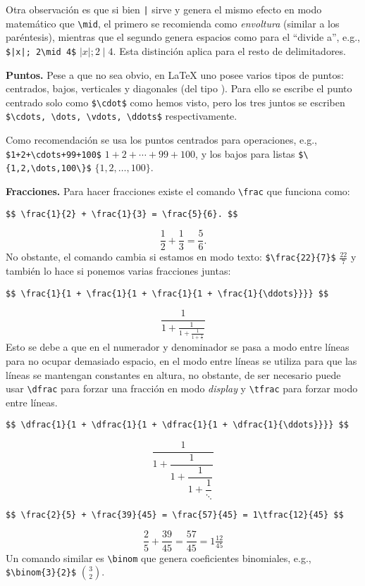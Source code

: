 Otra observación es que si bien \lstinline!|! sirve y genera el mismo efecto en modo matemático que \lstinline|\mid|, el primero se recomienda como \textit{envoltura} (similar a los paréntesis), mientras que el segundo genera espacios como para el ``divide a'', e.g., \lstinline!$|x|; 2\mid 4$! $|x|; 2\mid 4$.
Esta distinción aplica para el resto de delimitadores.

\textbf{Puntos.} Pese a que no sea obvio, en \LaTeX{} uno posee varios tipos de puntos: centrados, bajos, verticales y diagonales (del tipo \smash{$\ddots$}). Para ello se escribe el punto centrado solo como \lstinline|$\cdot$| como hemos visto, pero los tres juntos se escriben \lstinline|$\cdots, \dots, \vdots, \ddots$| \smash{$\cdots, \dots, \vdots, \ddots$} respectivamente.

Como recomendación se usa los puntos centrados para operaciones, e.g., \lstinline|$1+2+\cdots+99+100$| $1+2+\cdots+99+100$, y los bajos para listas \lstinline|$\{1,2,\dots,100\}$| $\{1,2,\dots,100\}$.

\textbf{Fracciones.} Para hacer fracciones existe el comando \lstinline|\frac| que funciona como:
\begin{lstlisting}
$$ \frac{1}{2} + \frac{1}{3} = \frac{5}{6}. $$
\end{lstlisting}
$$ \frac{1}{2} + \frac{1}{3} = \frac{5}{6}. $$
No obstante, el comando cambia si estamos en modo texto: \lstinline|$\frac{22}{7}$| $\frac{22}{7}$ y también lo hace si ponemos varias fracciones juntas:
\begin{lstlisting}[basicstyle=\scriptsize\ttfamily]
$$ \frac{1}{1 + \frac{1}{1 + \frac{1}{1 + \frac{1}{\ddots}}}} $$
\end{lstlisting}
$$ \frac{1}{1 + \frac{1}{1 + \frac{1}{1 + \frac{1}{\ddots}}}} $$
Esto se debe a que en el numerador y denominador se pasa a modo entre líneas para no ocupar demasiado espacio, en el modo entre líneas se utiliza para que las líneas se mantengan constantes en altura, no obstante, de ser necesario puede usar \lstinline|\dfrac| para forzar una fracción en modo \textit{display} y \lstinline|\tfrac| para forzar modo entre líneas.
\begin{lstlisting}[basicstyle=\scriptsize\ttfamily]
$$ \dfrac{1}{1 + \dfrac{1}{1 + \dfrac{1}{1 + \dfrac{1}{\ddots}}}} $$
\end{lstlisting}
$$ \dfrac{1}{1 + \dfrac{1}{1 + \dfrac{1}{1 + \dfrac{1}{\ddots}}}} $$
\begin{lstlisting}[basicstyle=\scriptsize\ttfamily]
$$ \frac{2}{5} + \frac{39}{45} = \frac{57}{45} = 1\tfrac{12}{45} $$
\end{lstlisting}
$$ \frac{2}{5} + \frac{39}{45} = \frac{57}{45} = 1\tfrac{12}{45} $$
Un comando similar es \lstinline|\binom| que genera coeficientes binomiales, e.g.,\break
\lstinline|$\binom{3}{2}$| $\binom{3}{2}$.

